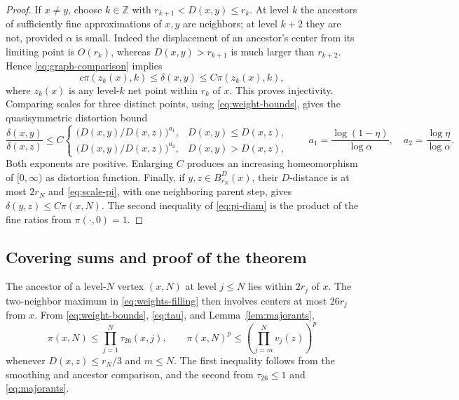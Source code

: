 \documentclass[11pt,reqno]{amsart}
\theoremstyle{plain}
\theoremstyle{definition}
\theoremstyle{remark}
\newcommand{\1}{\mathbf{1}}
\newcommand{\bd}{B^{D}}
\begin{document}
\begin{proof}
If $x\ne y$, choose $k\in\mathbb Z$ with $r_{k+1}<D(x,y)\le r_k$. At level $k$ the ancestors of sufficiently fine approximations of $x,y$ are neighbors; at level $k+2$ they are not, provided $\alpha$ is small. Indeed the displacement of an ancestor's center from its limiting point is $O(r_k)$, whereas $D(x,y)>r_{k+1}$ is much larger than $r_{k+2}$. Hence \eqref{eq:graph-comparison} implies
\begin{equation}\label{eq:scale-pi}
c\pi(z_k(x),k)\le\delta(x,y)\le C\pi(z_k(x),k),
\end{equation}
where $z_k(x)$ is any level-$k$ net point within $r_k$ of $x$. This proves injectivity. Comparing scales for three distinct points, using \eqref{eq:weight-bounds}, gives the quasisymmetric distortion bound
\[
\frac{\delta(x,y)}{\delta(x,z)}\le C
\begin{cases}
\bigl(D(x,y)/D(x,z)\bigr)^{a_1},&D(x,y)\le D(x,z),\\
\bigl(D(x,y)/D(x,z)\bigr)^{a_2},&D(x,y)>D(x,z),
\end{cases}
\qquad a_1=\frac{\log(1-\eta)}{\log\alpha},\quad a_2=\frac{\log\eta}{\log\alpha}.
\]
Both exponents are positive. Enlarging $C$ produces an increasing homeomorphism of $[0,\infty)$ as distortion function. Finally, if $y,z\in\bd_{r_N}(x)$, their $D$-distance is at most $2r_N$ and \eqref{eq:scale-pi}, with one neighboring parent step, gives $\delta(y,z)\le C\pi(x,N)$. The second inequality of \eqref{eq:pi-diam} is the product of the fine ratios from $\pi(\cdot,0)=1$.
\end{proof}

\subsection{Covering sums and proof of the theorem}\label{subsec:finish}
The ancestor of a level-$N$ vertex $(x,N)$ at level $j\le N$ lies within $2r_j$ of $x$. The two-neighbor maximum in \eqref{eq:weights-filling} then involves centers at most $26r_j$ from $x$. From \eqref{eq:weight-bounds}, \eqref{eq:tau}, and Lemma~\ref{lem:majorants},
\begin{equation}\label{eq:pi-product}
\pi(x,N)\le\prod_{j=1}^N\tau_{26}(x,j),\qquad
\pi(x,N)^p\le\left(\prod_{j=m}^Nv_j(z)\right)^p
\end{equation}
whenever $D(x,z)\le r_N/3$ and $m\le N$. The first inequality follows from the smoothing and ancestor comparison, and the second from $\tau_{26}\le1$ and \eqref{eq:majorants}.
\end{document}
